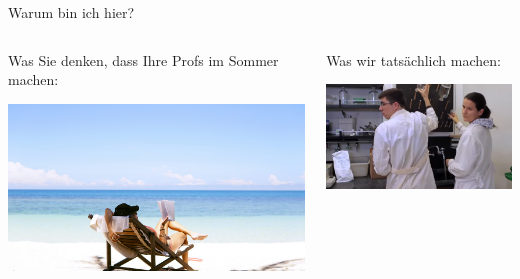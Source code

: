 \documentclass{beamer}
\begin{document}
\begin{frame}{Warum bin ich hier?}

\pause
\begin{columns}[t]

\begin{column}{5cm}
Was Sie denken, dass Ihre Profs im Sommer machen:

\begin{center}
    \includegraphics[width=\textwidth]{chen-mizrach-jL6PTWI7h18-unsplash.jpg}
\end{center}
\end{column}

\pause

\begin{column}{5cm}
Was wir tatsächlich machen: \\[0.8cm]

\begin{center}
    \includegraphics[width=\textwidth]{PhD_movie_screenshot.png}
\end{center}


\end{column}

    
\end{columns}
    
\end{frame}
\end{document}
